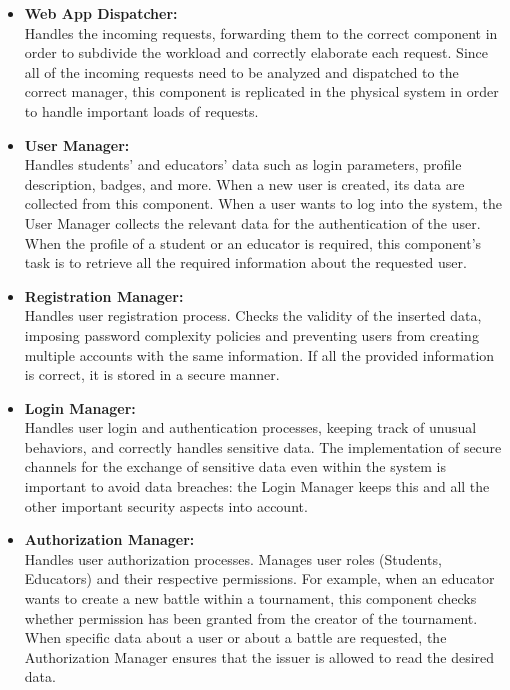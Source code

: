 \begin{itemize}

    \item \textbf{Web App Dispatcher:} \\
    Handles the incoming requests, forwarding them to the correct component in order to subdivide the workload and correctly elaborate each request. Since all of the incoming requests need to be analyzed and dispatched to the correct manager, this component is replicated in the physical system in order to handle important loads of requests.

    \item \textbf{User Manager:} \\
    Handles students' and educators' data such as login parameters, profile description, badges, and more. When a new user is created, its data are collected from this component. When a user wants to log into the system, the User Manager collects the relevant data for the authentication of the user. When the profile of a student or an educator is required, this component's task is to retrieve all the required information about the requested user.

    \item \textbf{Registration Manager:} \\
    Handles user registration process. Checks the validity of the inserted data, imposing password complexity policies and preventing users from creating multiple accounts with the same information. If all the provided information is correct, it is stored in a secure manner.

    \item \textbf{Login Manager:} \\
    Handles user login and authentication processes, keeping track of unusual behaviors, and correctly handles sensitive data. The implementation of secure channels for the exchange of sensitive data even within the system is important to avoid data breaches: the Login Manager keeps this and all the other important security aspects into account.

    \item \textbf{Authorization Manager:} \\
    Handles user authorization processes.
    Manages user roles (Students, Educators) and their respective permissions. For example, when an educator wants to create a new battle within a tournament, this component checks whether permission has been granted from the creator of the tournament. When specific data about a user or about a battle are requested, the Authorization Manager ensures that the issuer is allowed to read the desired data.


\end{itemize}
